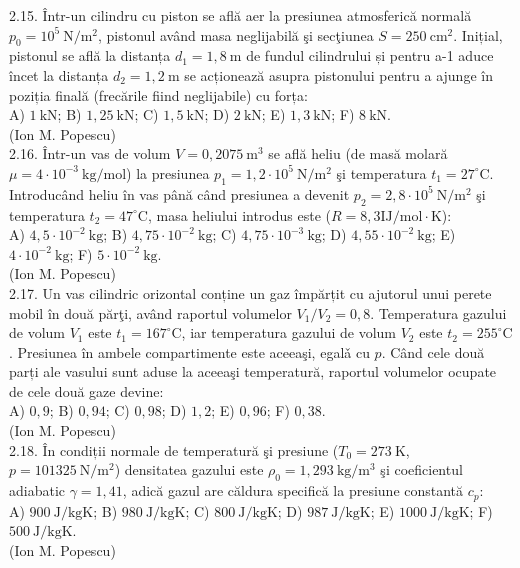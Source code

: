 2.15. Într-un cilindru cu piston se află aer la presiunea atmosferică normală $p_{0}=10^{5} \mathrm{~N} / \mathrm{m}^{2}$, pistonul având masa neglijabilă şi secţiunea $S=250 \mathrm{~cm}^{2}$. Inițial, pistonul se află la distanța $d_{1}=1,8 \mathrm{~m}$ de fundul cilindrului și pentru a-1 aduce încet la distanța $d_{2}=1,2 \mathrm{~m}$ se acționează asupra pistonului pentru a ajunge în poziția finală (frecările fiind neglijabile) cu forța:\\ A) $1 \mathrm{~kN}$; B) $1,25 \mathrm{~kN}$; C) $1,5 \mathrm{~kN}$; D) $2 \mathrm{~kN}$; E) $1,3 \mathrm{~kN}$; F) $8 \mathrm{~kN}$.\\ (Ion M. Popescu)\\

2.16. Într-un vas de volum $V=0,2075 \mathrm{~m}^{3}$ se află heliu (de masă molară $\mu=4 \cdot 10^{-3} \mathrm{~kg} / \mathrm{mol}$) la presiunea $p_{1}=1,2 \cdot 10^{5} \mathrm{~N} / \mathrm{m}^{2}$ şi temperatura $t_{1}=27^{\circ} \mathrm{C}$. Introducând heliu în vas până când presiunea a devenit $p_{2}=2,8 \cdot 10^{5} \mathrm{~N} / \mathrm{m}^{2}$ şi temperatura $t_{2}=47^{\circ} \mathrm{C}$, masa heliului introdus este ($R=8,3 \mathrm{IJ} / \mathrm{mol} \cdot \mathrm{K}$):\\ A) $4,5 \cdot 10^{-2} \mathrm{~kg}$; B) $4,75 \cdot 10^{-2} \mathrm{~kg}$; C) $4,75 \cdot 10^{-3} \mathrm{~kg}$; D) $4,55 \cdot 10^{-2} \mathrm{~kg}$; E) $4 \cdot 10^{-2} \mathrm{~kg}$; F) $5 \cdot 10^{-2} \mathrm{~kg}$.\\ (Ion M. Popescu)\\

2.17. Un vas cilindric orizontal conține un gaz împărțit cu ajutorul unui perete mobil în două părţi, având raportul volumelor $V_{1} / V_{2}=0,8$. Temperatura gazului de volum $V_{1}$ este $t_{1}=167^{\circ} \mathrm{C}$, iar temperatura gazului de volum $V_{2}$ este $t_{2}=255^{\circ} \mathrm{C}$. Presiunea în ambele compartimente este aceeaşi, egalǎ cu $p$. Când cele două parți ale vasului sunt aduse la aceeaşi temperatură, raportul volumelor ocupate de cele două gaze devine:\\ A) $0,9$; B) $0,94$; C) $0,98$; D) $1,2$; E) $0,96$; F) $0,38$.\\ (Ion M. Popescu)\\

2.18. În condiții normale de temperatură şi presiune ($T_{0}=273 \mathrm{~K}$, $p=101325 \mathrm{~N} / \mathrm{m}^{2}$) densitatea gazului este $\rho_{0}=1,293 \mathrm{~kg} / \mathrm{m}^{3}$ şi coeficientul adiabatic $\gamma=1,41$, adică gazul are căldura specifică la presiune constantă $c_{p}$:\\ A) $900 \mathrm{~J} / \mathrm{kgK}$; B) $980 \mathrm{~J} / \mathrm{kgK}$; C) $800 \mathrm{~J} / \mathrm{kgK}$; D) $987 \mathrm{~J} / \mathrm{kgK}$; E) $1000 \mathrm{~J} / \mathrm{kgK}$; F) $500 \mathrm{~J} / \mathrm{kgK}$.\\ (Ion M. Popescu)\\


